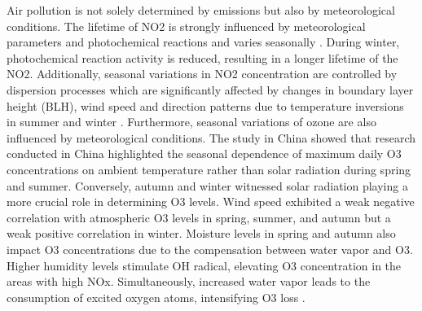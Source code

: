 Air pollution is not solely determined by emissions but also by meteorological conditions. The lifetime of NO2 is strongly influenced by meteorological parameters and photochemical reactions \citep{barre2021estimating} and varies seasonally \citep{dragomir2015modeling,kendrick2015diurnal}. During winter, photochemical reaction activity is reduced, resulting in a longer lifetime of the NO2. Additionally, seasonal variations in NO2 concentration are controlled by dispersion processes which are significantly affected by changes in boundary layer height (BLH), wind speed and direction patterns due to temperature inversions in summer and winter \citep{barre2021estimating,kendrick2015diurnal}. Furthermore, seasonal variations of ozone are also influenced by meteorological conditions. The study in China showed that research conducted in China highlighted the seasonal dependence of maximum daily O3 concentrations on ambient temperature rather than solar radiation during spring and summer. Conversely, autumn and winter witnessed solar radiation playing a more crucial role in determining O3 levels. Wind speed exhibited a weak negative correlation with atmospheric O3 levels in spring, summer, and autumn but a weak positive correlation in winter. Moisture levels in spring and autumn also impact O3 concentrations due to the compensation between water vapor and O3. Higher humidity levels stimulate OH radical, elevating O3 concentration in the areas with high NOx. Simultaneously, increased water vapor leads to the consumption of excited oxygen atoms, intensifying O3 loss \citep{yu2021review}. \par
